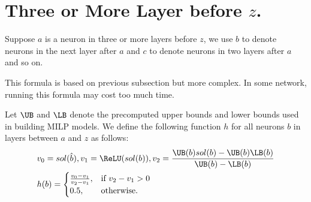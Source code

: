 \section{Three or More Layer before  $z$.}



Suppose $a$ is a neuron in three or more layers before $z$, we use $b$ to denote neurons in the next layer after $a$ and $c$ to denote neurons in two layers after $a$ and so on.

This formula is based on previous subsection but more complex. In some network, running this formula may cost too much time. 


\begin{definition}\label{3layer}
Let $\UB$ and $\LB$ denote the precomputed upper bounds and lower bounds used in building MILP models. We define the following function $h$ for all neurons $b$ in layers between $a$ and $z$ as follows:
	\begin{align}
		&v_0 = sol(\hat{b}), v_1 = \ReLU(sol(b)), v_2 = \frac{\UB(b)sol(b)-\UB(b)\LB(b)}{\UB(b)-\LB(b)}\\
		&h(b) =
		\begin{cases}
			\frac{v_0-v_1}{v_2-v_1}, & \text{if } v_2-v_1 > 0\\
			0.5, & \text{otherwise.}
		\end{cases}
	\end{align} 
\end{definition} 

